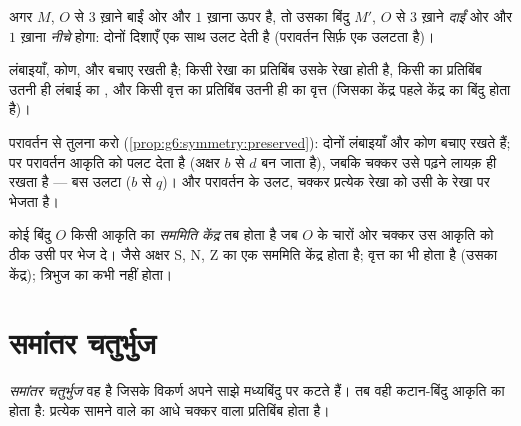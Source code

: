 \begin{example}[जाल वाले काग़ज़ पर]\label{ex:g7:central:grid}
अगर $M$, $O$ से $3$ ख़ाने बाईं ओर और $1$ ख़ाना ऊपर है, तो उसका
 बिंदु $M'$, $O$ से $3$ ख़ाने \emph{दाईं} ओर और $1$ ख़ाना
\emph{नीचे} होगा:  दोनों दिशाएँ एक साथ उलट देती है
(परावर्तन सिर्फ़ एक उलटता है)।
\end{example}

\begin{proposition}[आधा चक्कर क्या-क्या बचाए रखता है]\label{prop:g7:central:preserved}
 लंबाइयाँ, कोण,  और  बचाए रखती है;
किसी रेखा का प्रतिबिंब उसके \emph{} रेखा होती है, किसी
 का प्रतिबिंब उतनी ही लंबाई का  , और किसी वृत्त
का प्रतिबिंब उतनी ही  का वृत्त (जिसका केंद्र पहले केंद्र का
 बिंदु होता है)।
\end{proposition}
\admitted

\begin{remark}
परावर्तन से तुलना करो (\cref{prop:g6:symmetry:preserved}): दोनों
लंबाइयाँ और कोण बचाए रखते हैं; पर परावर्तन आकृति को पलट देता है
(अक्षर $b$ से $d$ बन जाता है), जबकि  चक्कर उसे पढ़ने लायक़ ही
रखता है --- बस उलटा ($b$ से $q$)। और परावर्तन के उलट,  चक्कर
प्रत्येक रेखा को उसी के  रेखा पर भेजता है।
\end{remark}

\begin{definition}[सममिति केंद्र]\label{def:g7:central:center}
कोई बिंदु $O$ किसी आकृति का \emph{सममिति केंद्र}
तब होता है जब $O$ के चारों ओर  चक्कर उस आकृति को ठीक उसी पर भेज
दे। जैसे अक्षर S, N, Z का एक सममिति केंद्र होता है; वृत्त का भी
होता है (उसका केंद्र); त्रिभुज का कभी नहीं होता।
\end{definition}

\section{समांतर चतुर्भुज}

\begin{definition}[समांतर चतुर्भुज]\label{def:g7:central:parallelogram}
\emph{समांतर चतुर्भुज} वह  है जिसके
विकर्ण अपने साझे मध्यबिंदु पर कटते हैं। तब वही कटान-बिंदु आकृति का
 होता है: प्रत्येक  सामने वाले  का आधे चक्कर
वाला प्रतिबिंब होता है।
\end{definition}

